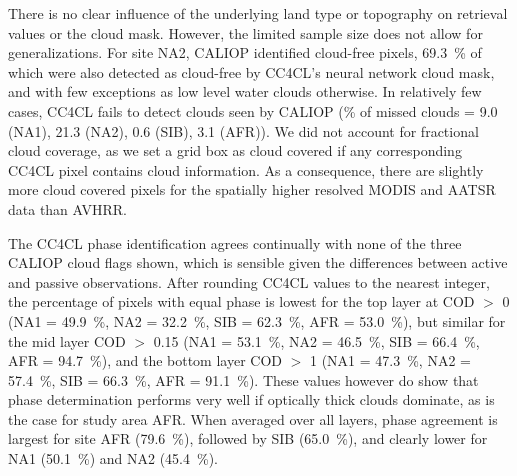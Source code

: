 There is no clear influence of the underlying land type or topography on retrieval values or the cloud mask. However, the limited sample size does not allow for generalizations. For site NA2, CALIOP identified cloud-free pixels, 69.3~\% of which were also detected as cloud-free by CC4CL's neural network cloud mask, and with few exceptions as low level water clouds otherwise. In relatively few cases, CC4CL fails to detect clouds seen by CALIOP (\% of missed clouds = 9.0 (NA1), 21.3 (NA2), 0.6 (SIB), 3.1 (AFR)). We did not account for fractional cloud coverage, as we set a grid box as cloud covered if any corresponding CC4CL pixel contains cloud information. As a consequence, there are slightly more cloud covered pixels for the spatially higher resolved MODIS and AATSR data than AVHRR.

The CC4CL phase identification agrees continually with none of the three CALIOP cloud flags shown, which is sensible given the differences between active and passive observations. After rounding CC4CL values to the nearest integer, the percentage of pixels with equal phase is lowest for the top layer at COD $>$ 0 (NA1 = 49.9~\%, NA2 = 32.2~\%, SIB = 62.3~\%, AFR = 53.0~\%), but similar for the mid layer COD $>$ 0.15 (NA1 = 53.1~\%, NA2 = 46.5~\%, SIB = 66.4~\%, AFR = 94.7~\%), and the bottom layer COD $>$ 1 (NA1 = 47.3~\%, NA2 = 57.4~\%, SIB = 66.3~\%, AFR = 91.1~\%). These values however do show that phase determination performs very well if optically thick clouds dominate, as is the case for study area AFR. When averaged over all layers, phase agreement is largest for site AFR (79.6~\%), followed by SIB (65.0~\%), and clearly lower for NA1 (50.1~\%) and NA2 (45.4~\%).

